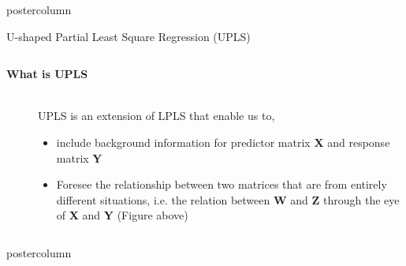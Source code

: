 \documentclass[9pt, final]{beamer}\usepackage[]{graphicx}\usepackage[]{color}
\newlength{\bottomcolumn}
\begin{document}
\begin{frame}[fragile]
\begin{columns}
\begin{column}{.49\textwidth}
\begin{beamercolorbox}[center,wd=\textwidth]{postercolumn}
\begin{minipage}[T]{.98\textwidth}
{\begin{block}{U-shaped Partial Least Square Regression (UPLS)}
\begin{columns}[T, onlytextwidth]
\begin{description}
\begin{itemize}
			            \end{itemize}
				        \end{description}
				\end{columns}  
				\vspace{1cm}      
				\begin{description}
					\item[\textbf{What is UPLS}]\hfill\\
					UPLS is an extension of LPLS that enable us to,
					\begin{itemize}
						\item include background information for predictor matrix \textbf{X} and response matrix \textbf{Y}
						\item Foresee the relationship between two matrices that are from entirely different situations, i.e. the relation between \textbf{W} and \textbf{Z} through the eye of \textbf{X} and \textbf{Y} (Figure above)
					\end{itemize}
				\end{description}
            \end{block}
          }
        \end{minipage}
      \end{beamercolorbox}
\end{column}

\end{columns}
\vspace{1cm}
\begin{columns}
\begin{column}{\textwidth}
\begin{beamercolorbox}[center, wd=\textwidth]{postercolumn}
  \begin{minipage}[T]{0.98\textwidth}  %
    \parbox[t][\bottomcolumn]{\textwidth}{ 
      
}
\end{minipage}
\end{beamercolorbox}
\end{column}
\end{columns}
\end{frame}
\end{document}
